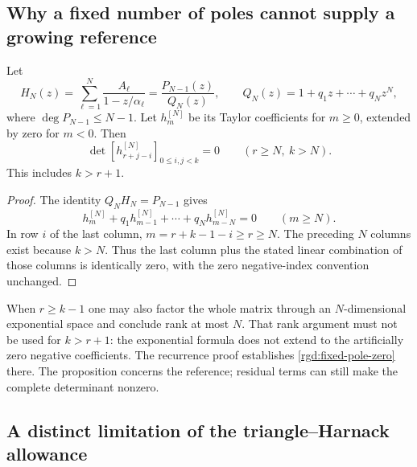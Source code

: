 \subsection{Why a fixed number of poles cannot supply a growing reference}

\begin{proposition}
\label{rgd:finite-poles}
Let
\[
 H_N(z)=\sum_{\ell=1}^N\frac{A_\ell}{1-z/\alpha_\ell}
       =\frac{P_{N-1}(z)}{Q_N(z)},\qquad
 Q_N(z)=1+q_1z+\cdots+q_Nz^N,
\]
where $\deg P_{N-1}\le N-1$.  Let $h_m^{[N]}$ be its Taylor
coefficients for $m\ge0$, extended by zero for $m<0$.  Then
\begin{equation}
 \det[h_{r+j-i}^{[N]}]_{0\le i,j<k}=0
       \qquad(r\ge N,\ k>N).
 \label{rgd:fixed-pole-zero}
\end{equation}
This includes $k>r+1$.
\end{proposition}
\begin{proof}
The identity $Q_NH_N=P_{N-1}$ gives
\[
 h_m^{[N]}+q_1h_{m-1}^{[N]}+\cdots+q_Nh_{m-N}^{[N]}=0
       \qquad(m\ge N).
\]
In row $i$ of the last column, $m=r+k-1-i\ge r\ge N$.
The preceding $N$ columns exist because $k>N$.  Thus the last column
plus the stated linear combination of those columns is identically
zero, with the zero negative-index convention unchanged.
\end{proof}

When $r\ge k-1$ one may also factor the whole matrix through an
$N$-dimensional exponential space and conclude rank at most $N$.
That rank argument must not be used for $k>r+1$: the exponential
formula does not extend to the artificially zero negative coefficients.
The recurrence proof establishes \eqref{rgd:fixed-pole-zero} there.
The proposition concerns the reference; residual terms can still make
the complete determinant nonzero.

\subsection{A distinct limitation of the triangle--Harnack allowance}
\label{rgd:harnack-section}

